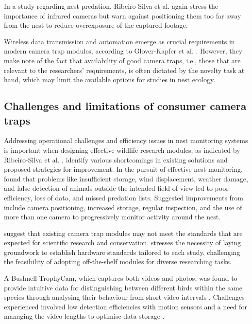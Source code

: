 \documentclass[class=report,11pt,crop=false]{standalone}
\begin{document}
In a study regarding nest predation, Ribeiro-Silva et al. \cite{ribeiro-silva2018testing} again stress the importance of infrared cameras but warn against positioning them too far away from the nest to reduce overexposure of the captured footage.

Wireless data transmission and automation emerge as crucial requirements in modern camera trap modules, according to Glover-Kapfer et al. \cite{glover2019camera}. However, they make note of the fact that availability of good camera traps, i.e., those that are relevant to the researchers’ requirements, is often dictated by the novelty task at hand, which may limit the available options for studies in nest ecology.  

\subsection{Challenges and limitations of consumer camera traps}

Addressing operational challenges and efficiency issues in nest monitoring systems is important when designing effective wildlife research modules, as indicated by Ribeiro-Silva  et al. \cite{ribeiro-silva2018testing}, identify various shortcomings in existing solutions and proposed strategies for improvement. In the pursuit of effective nest monitoring, \cite{ribeiro-silva2018testing} found that problems like insufficient storage, wind displacement, weather damage, and false detection of animals outside the intended field of view led to poor efficiency, loss of data, and missed predation lists. Suggested improvements from \cite{ribeiro-silva2018testing} include camera positioning, increased storage, regular inspection, and the use of more than one camera to progressively monitor activity around the nest. 

\cite{ahumada2020wildlife} suggest that existing camera trap modules may not meet the standards that are expected for scientific research and conservation. \cite{ahumada2020wildlife} stresses the necessity of laying groundwork to establish hardware standards tailored to each study, challenging the feasibility of adopting off-the-shelf modules for diverse researching tasks. 

A Bushnell TrophyCam, which captures both videos and photos, was found to provide intuitive data for distinguishing between different birds within the same species through analysing their behaviour from short video intervals \cite{glover2019camera}. Challenges experienced involved low detection efficiencies with motion sensors and a need for managing the video lengths to optimise data storage \cite{ribeiro-silva2018testing}. 
\end{document}
